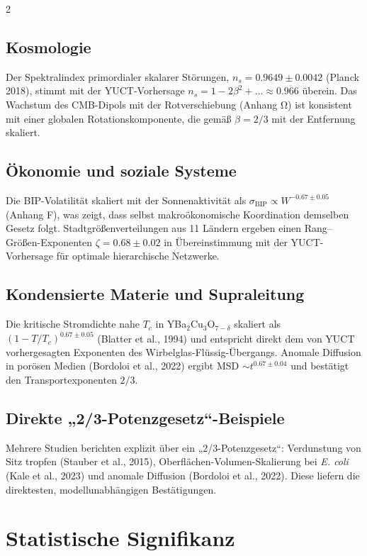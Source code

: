 \documentclass[11pt,a4paper]{article}
\newcommand{\betaf}{\beta}
\begin{document}
\begin{multicols}{2}
		\subsection{Kosmologie}
		Der Spektralindex primordialer skalarer Störungen, \(n_s = 0.9649\pm0.0042\) (Planck 2018), stimmt mit der YUCT-Vorhersage \(n_s = 1 - 2\betaf^2 + \dots \approx 0.966\) überein. Das Wachstum des CMB-Dipols mit der Rotverschiebung (Anhang Ω) ist konsistent mit einer globalen Rotationskomponente, die gemäß \(\betaf = 2/3\) mit der Entfernung skaliert.
		
		\subsection{Ökonomie und soziale Systeme}
		Die BIP-Volatilität skaliert mit der Sonnenaktivität als \(\sigma_{\text{BIP}} \propto W^{-0.67\pm0.05}\) (Anhang F), was zeigt, dass selbst makroökonomische Koordination demselben Gesetz folgt. Stadtgrößenverteilungen aus 11 Ländern ergeben einen Rang–Größen-Exponenten \(\zeta = 0.68\pm0.02\) in Übereinstimmung mit der YUCT-Vorhersage für optimale hierarchische Netzwerke.
		
		\subsection{Kondensierte Materie und Supraleitung}
		Die kritische Stromdichte nahe \(T_c\) in YBa\(_2\)Cu\(_3\)O\(_{7-\delta}\) skaliert als \((1-T/T_c)^{0.67\pm0.05}\) (Blatter et al., 1994) und entspricht direkt dem von YUCT vorhergesagten Exponenten des Wirbelglas-Flüssig-Übergangs. Anomale Diffusion in porösen Medien (Bordoloi et al., 2022) ergibt MSD \(\sim t^{0.67\pm0.04}\) und bestätigt den Transportexponenten \(2/3\).
		
		\subsection{Direkte „2/3-Potenzgesetz“-Beispiele}
		Mehrere Studien berichten explizit über ein „2/3-Potenzgesetz“: Verdunstung von Sitz tropfen (Stauber et al., 2015), Oberflächen-Volumen-Skalierung bei \emph{E. coli} (Kale et al., 2023) und anomale Diffusion (Bordoloi et al., 2022). Diese liefern die direktesten, modellunabhängigen Bestätigungen.
		
		\section{Statistische Signifikanz}
		

\end{multicols}
\end{document}
